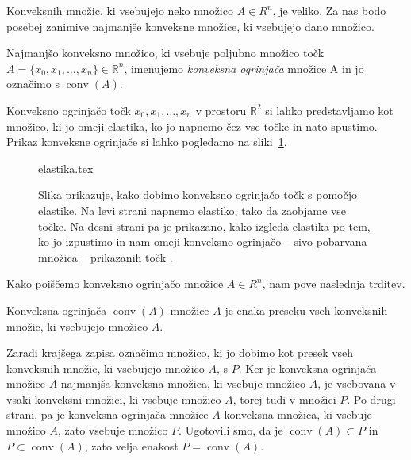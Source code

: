 \documentclass[mat1]{fmfdelo}
\newcommand{\R}{\mathbb R}
\DeclareMathOperator{\conv}{conv}
\newcommand{\0}{\underline{0}}
\begin{document}
Konveksnih množic, ki vsebujejo neko množico $A \in R^n$, je veliko. Za nas bodo posebej zanimive najmanjše konveksne množice, ki vsebujejo dano množico.
\begin{definicija}
Najmanjšo konveksno množico, ki vsebuje poljubno množico točk $A = \{x_0, x_1, \dots, x_n \} \in \R^n$, imenujemo \emph{konveksna ogrinjača} množice A in jo označimo s $\conv(A)$.
\end{definicija}
Konveksno ogrinjačo točk $x_0, x_1, \dots, x_n$ v prostoru $\R^2$ si lahko predstavljamo kot množico, ki jo omeji elastika, ko jo napnemo čez vse točke in nato spustimo. Prikaz konveksne ogrinjače si lahko pogledamo na sliki~\ref{fig:konvexhull}.
\begin{figure}[h]  
\centering 
	{elastika.tex}%
	\caption{Slika prikazuje, kako dobimo konveksno ogrinjačo točk s pomočjo elastike. Na levi strani napnemo elastiko, tako da zaobjame vse točke. Na desni strani pa je prikazano, kako izgleda elastika po tem, ko jo izpustimo in nam omeji konveksno ogrinjačo -- sivo pobarvana množica -- prikazanih točk .} \label{fig:konvexhull}
\end{figure} 
Kako poiščemo konveksno ogrinjačo množice $A \in R^n$, nam pove naslednja trditev.
\begin{trditev}\label{trd:presek-konv}
Konveksna ogrinjača $\conv(A)$ množice $A$ je enaka preseku vseh konveksnih množic, ki vsebujejo množico $A$.
\end{trditev}
\begin{dokaz}
Zaradi krajšega zapisa označimo množico, ki jo dobimo kot presek vseh konveksnih množic, ki vsebujejo množico $A$, s $P$. Ker je konveksna ogrinjača množice $A$ najmanjša konveksna množica, ki vsebuje množico $A$, je vsebovana v vsaki konveksni množici, ki vsebuje množico $A$, torej tudi v množici $P$. Po drugi strani, pa je konveksna ogrinjača množice $A$ konveksna množica, ki vsebuje množico $A$, zato vsebuje množico $P$. Ugotovili smo, da je $\conv(A) \subset P$ in $P \subset \conv(A)$, zato velja enakost $P = \conv(A)$.
\end{dokaz}
\end{document}
